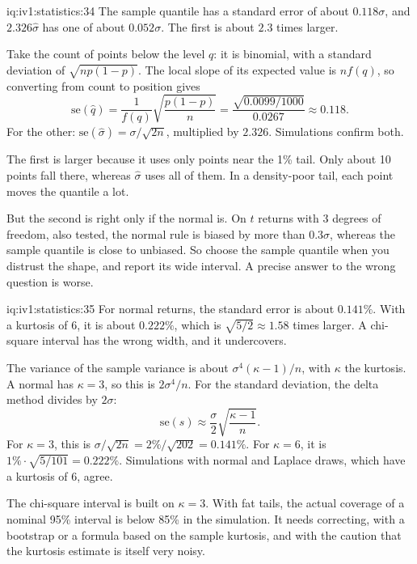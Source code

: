 \begin{solution}{iq:iv1:statistics:34}
The sample quantile has a standard error of about $0.118\sigma$, and $2.326\hat\sigma$ has one of about $0.052\sigma$. The first is about $2.3$ times larger.

Take the count of points below the level $q$: it is binomial, with a standard deviation of $\sqrt{np(1 - p)}$. The local slope of its expected value is $nf(q)$, so converting from count to position gives
\[
\mathrm{se}(\hat{q}) = \frac{1}{f(q)}\sqrt{\frac{p(1 - p)}{n}} = \frac{\sqrt{0.0099/1000}}{0.0267} \approx 0.118.
\]
For the other: $\mathrm{se}(\hat\sigma) = \sigma/\sqrt{2n}$, multiplied by $2.326$. Simulations confirm both.

The first is larger because it uses only points near the 1\% tail. Only about 10 points fall there, whereas $\hat\sigma$ uses all of them. In a density-poor tail, each point moves the quantile a lot.

But the second is right only if the normal is. On $t$ returns with 3 degrees of freedom, also tested, the normal rule is biased by more than $0.3\sigma$, whereas the sample quantile is close to unbiased. So choose the sample quantile when you distrust the shape, and report its wide interval. A precise answer to the wrong question is worse.

\end{solution}

\begin{solution}{iq:iv1:statistics:35}
For normal returns, the standard error is about $0.141\%$. With a kurtosis of 6, it is about $0.222\%$, which is $\sqrt{5/2} \approx 1.58$ times larger. A chi-square interval has the wrong width, and it undercovers.

The variance of the sample variance is about $\sigma^4(\kappa - 1)/n$, with $\kappa$ the kurtosis. A normal has $\kappa = 3$, so this is $2\sigma^4/n$. For the standard deviation, the delta method divides by $2\sigma$:
\[
\mathrm{se}(s) \approx \frac{\sigma}{2}\sqrt{\frac{\kappa - 1}{n}}.
\]
For $\kappa = 3$, this is $\sigma/\sqrt{2n} = 2\%/\sqrt{202} = 0.141\%$. For $\kappa = 6$, it is $1\% \cdot \sqrt{5/101} = 0.222\%$. Simulations with normal and Laplace draws, which have a kurtosis of 6, agree.

The chi-square interval is built on $\kappa = 3$. With fat tails, the actual coverage of a nominal 95\% interval is below 85\% in the simulation. It needs correcting, with a bootstrap or a formula based on the sample kurtosis, and with the caution that the kurtosis estimate is itself very noisy.

\end{solution}

